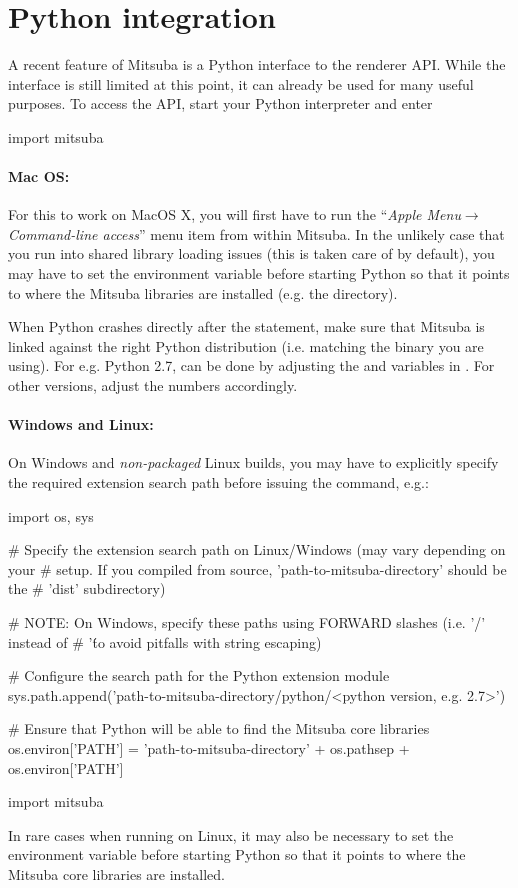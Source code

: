 \section{Python integration}
\label{sec:python}
A recent feature of Mitsuba is a Python interface to the renderer API.
While the interface is still limited at this point, it can already be
used for many useful purposes. To access the API, start your Python
interpreter and enter
\begin{python}
import mitsuba
\end{python}
\paragraph{Mac OS:}
For this to work on MacOS X, you will first have to run the ``\emph{Apple
Menu}$\to$\emph{Command-line access}'' menu item from within Mitsuba.
In the unlikely case that you run into shared library loading issues (this is
taken care of by default), you may have to set the 
environment variable before starting Python so that it points to where the
Mitsuba libraries are installed (e.g. the 
directory).

When Python crashes directly after the  statement,
make sure that Mitsuba is linked against the right Python distribution
(i.e. matching the  binary you are using). For e.g. Python
2.7, can be done by adjusting the  and
 variables in . For other versions,
adjust the numbers accordingly.

\paragraph{Windows and Linux:}
On Windows and \emph{non-packaged} Linux builds, you may have to explicitly
specify the required extension search path before issuing the  command, e.g.:
\begin{python}
import os, sys

# Specify the extension search path on Linux/Windows (may vary depending on your
# setup. If you compiled from  source, 'path-to-mitsuba-directory' should be the
# 'dist' subdirectory)

# NOTE: On Windows, specify these paths using FORWARD slashes (i.e. '/' instead of
# '\' to avoid pitfalls with string escaping)

# Configure the search path for the Python extension module
sys.path.append('path-to-mitsuba-directory/python/<python version, e.g. 2.7>')

# Ensure that Python will be able to find the Mitsuba core libraries
os.environ['PATH'] = 'path-to-mitsuba-directory' + os.pathsep + os.environ['PATH']

import mitsuba
\end{python}
In rare cases when running on Linux, it may also be necessary to set the
 environment variable before starting Python so that it
points to where the Mitsuba core libraries are installed.

